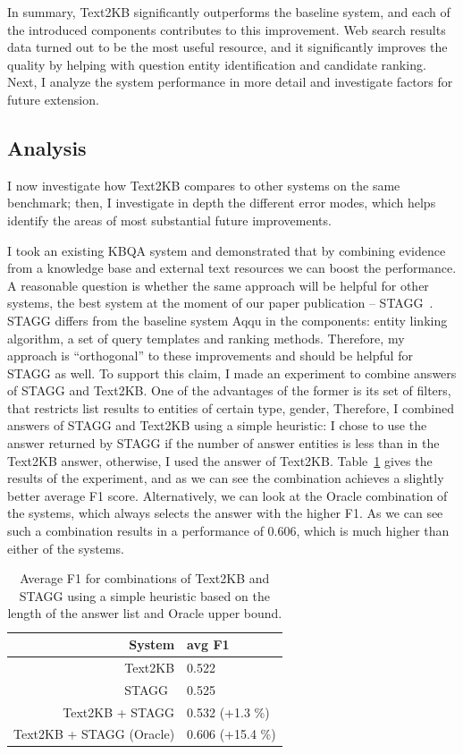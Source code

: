 In summary, Text2KB significantly outperforms the baseline system, and each of the introduced components contributes to this improvement.
Web search results data turned out to be the most useful resource, and it significantly improves the quality by helping with question entity identification and candidate ranking.
Next, I analyze the system performance in more detail and investigate factors for future extension.

\subsection{Analysis}
\label{section:factoid:approaches:text2kb:analysis}

I now investigate how Text2KB compares to other systems on the same benchmark; then, I investigate in depth the different error modes, which helps identify the areas of most substantial future improvements.

I took an existing KBQA system and demonstrated that by combining evidence from a knowledge base and external text resources we can boost the performance.
A reasonable question is whether the same approach will be helpful for other systems, \eg the best system at the moment of our paper publication -- STAGG~\cite{yih:ACL:2015:STAGG}.
STAGG differs from the baseline system Aqqu in the components: entity linking algorithm, a set of query templates and ranking methods.
Therefore, my approach is ``orthogonal'' to these improvements and should be helpful for STAGG as well.
To support this claim, I made an experiment to combine answers of STAGG and Text2KB.
One of the advantages of the former is its set of filters, that restricts list results to entities of certain type, gender, \etc
Therefore, I combined answers of STAGG and Text2KB using a simple heuristic: I chose to use the answer returned by STAGG if the number of answer entities is less than in the Text2KB answer, otherwise, I used the answer of Text2KB.
Table~\ref{table:factoid:text2kb:combine_stagg} gives the results of the experiment, and as we can see the combination achieves a slightly better average F1 score.
Alternatively, we can look at the Oracle combination of the systems, which always selects the answer with the higher F1.
As we can see such a combination results in a performance of 0.606, which is much higher than either of the systems.

\begin{table}
\centering
\begin{tabular}{rl}
System  & avg F1 \\
\hline
Text2KB & 0.522\\
STAGG~\cite{yih:ACL:2015:STAGG} & 0.525\\
Text2KB + STAGG & 0.532 (+1.3 \%) \\
Text2KB + STAGG (Oracle) & 0.606 (+15.4 \%) \\
\end{tabular}
\caption{Average F1 for combinations of Text2KB and STAGG using a simple heuristic based on the length of the answer list and Oracle upper bound.}
\label{table:factoid:text2kb:combine_stagg}
\end{table}

